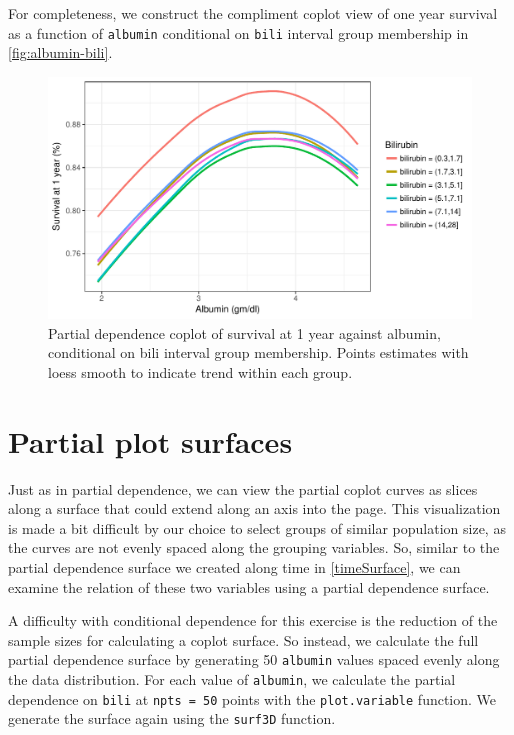 \documentclass[article]{jss}
\begin{document}
For completeness, we construct the compliment coplot view of one year
survival as a function of \texttt{albumin} conditional on \texttt{bili}
interval group membership in \autoref{fig:albumin-bili}.

\begin{Schunk}
\begin{figure}[!htb]

{\centering \includegraphics{rfs-albumin-bili-1} 

}

\caption[Partial dependence coplot of survival at 1 year against albumin, conditional on bili interval group membership]{Partial dependence coplot of survival at 1 year against albumin, conditional on bili interval group membership. Points estimates with loess smooth to indicate trend within each group.}\label{fig:albumin-bili}
\end{figure}
\end{Schunk}

\section{Partial plot surfaces}\label{partial-plot-surfaces}

Just as in partial dependence, we can view the partial coplot curves as
slices along a surface that could extend along an axis into the page.
This visualization is made a bit difficult by our choice to select
groups of similar population size, as the curves are not evenly spaced
along the grouping variables. So, similar to the partial dependence
surface we created along time in \autoref{timeSurface}, we can examine
the relation of these two variables using a partial dependence surface.

A difficulty with conditional dependence for this exercise is the
reduction of the sample sizes for calculating a coplot surface. So
instead, we calculate the full partial dependence surface by generating
50 \texttt{albumin} values spaced evenly along the data distribution.
For each value of \texttt{albumin}, we calculate the partial dependence
on \texttt{bili} at \texttt{npts\ =\ 50} points with the
\texttt{plot.variable} function. We generate the surface again using the
\texttt{surf3D} function.
\end{document}
